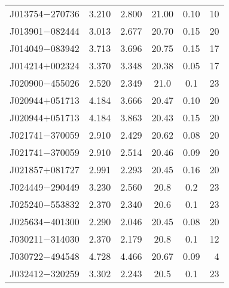 \begin{table}
\begin{center}
{\begin{tabular}{lccccr}
 J013754$-$270736 &      3.210 &                    2.800 &                   21.00 &               0.10 &                10 \\
 J013901$-$082444 &      3.013 &                    2.677 &                   20.70 &               0.15 &                20 \\
 J014049$-$083942 &      3.713 &                    3.696 &                   20.75 &               0.15 &                17 \\
 J014214$+$002324 &      3.370 &                    3.348 &                   20.38 &               0.05 &                17 \\
 J020900$-$455026 &      2.520 &                    2.349 &                    21.0 &                0.1 &                23 \\
 J020944$+$051713 &      4.184 &                    3.666 &                   20.47 &               0.10 &                20 \\
 J020944$+$051713 &      4.184 &                    3.863 &                   20.43 &               0.15 &                20 \\
 J021741$-$370059 &      2.910 &                    2.429 &                   20.62 &               0.08 &                20 \\
 J021741$-$370059 &      2.910 &                    2.514 &                   20.46 &               0.09 &                20 \\
 J021857$+$081727 &      2.991 &                    2.293 &                   20.45 &               0.16 &                20 \\
 J024449$-$290449 &      3.230 &                    2.560 &                    20.8 &                0.2 &                23 \\
 J025240$-$553832 &      2.370 &                    2.340 &                    20.6 &                0.1 &                23 \\
 J025634$-$401300 &      2.290 &                    2.046 &                   20.45 &               0.08 &                20 \\
 J030211$-$314030 &      2.370 &                    2.179 &                    20.8 &                0.1 &                12 \\
 J030722$-$494548 &      4.728 &                    4.466 &                   20.67 &               0.09 &                 4 \\
 J032412$-$320259 &      3.302 &                    2.243 &                    20.5 &                0.1 &                23 \\

\end{tabular}}
\end{center}
\end{table}

